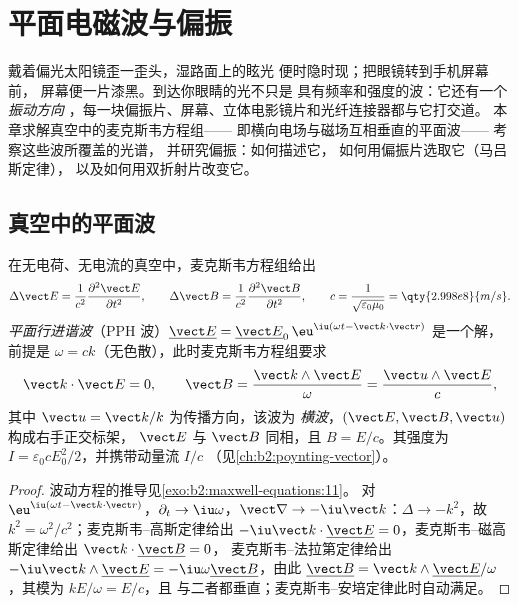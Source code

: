 \chapter{平面电磁波与偏振}\label{ch:b2:plane-waves-polarization}

戴着偏光太阳镜歪一歪头，湿路面上的眩光
便时隐时现；把眼镜转到手机屏幕前，
屏幕便一片漆黑。到达你眼睛的光不只是
具有频率和强度的波：它还有一个\emph{振动方向
}，每一块偏振片、屏幕、立体电影镜片和光纤连接器都与它打交道。
本章求解真空中的麦克斯韦方程组——
即横向电场与磁场互相垂直的平面波——
考察这些波所覆盖的光谱，
并研究偏振：如何描述它，
如何用偏振片选取它（马吕斯定律），
以及如何用双折射片改变它。

\section{真空中的平面波}

\begin{theorem}\label{thm:b2:plane-waves-polarization:wave}
在无电荷、无电流的真空中，麦克斯韦方程组给出
\[
\Delta\vect E = \frac1{c^2}\frac{\partial^2\vect E}{\partial t^2} , \qquad
\Delta\vect B = \frac1{c^2}\frac{\partial^2\vect B}{\partial t^2} , \qquad
c = \frac1{\sqrt{\varepsilon_0\mu_0}} = \qty{2.998e8}{m/s} .
\]
\emph{平面行进谐波}（PPH 波）$\underline{\vect E} =
\underline{\vect E}_0\,\eu^{\iu(\omega t - \vect k\cdot\vect r)}$ 是一个解，前提是
$\omega = ck$（无色散），此时麦克斯韦方程组要求
\[
\vect k\cdot\vect E = 0 , \qquad
\vect B = \frac{\vect k\wedge\vect E}\omega = \frac{\vect u\wedge\vect E}c ,
\]
其中 $\vect u = \vect k/k$ 为传播方向，该波为
\emph{横波}，$(\vect E, \vect B, \vect u)$ 构成右手正交标架，
$\vect E$ 与 $\vect B$ 同相，且 $B = E/c$。其强度为
$I = \varepsilon_0cE_0^2/2$，并携带动量流 $I/c$
（见\cref{ch:b2:poynting-vector}）。
\end{theorem}

\begin{proof}
波动方程的推导见\cref{exo:b2:maxwell-equations:11}。
对 $\eu^{\iu(\omega t - \vect k\cdot\vect r)}$，$\partial_t \to \iu\omega$，$\vect\nabla \to
-\iu\vect k$：$\Delta \to -k^2$，故 $k^2 = \omega^2/c^2$；麦克斯韦--高斯定律给出 $-\iu
\vect k\cdot\underline{\vect E} = 0$，麦克斯韦--磁高斯定律给出 $\vect k\cdot\underline{\vect B} = 0$，
麦克斯韦–法拉第定律给出 $-\iu\vect k\wedge\underline{\vect E} = -\iu\omega\underline{\vect B}$，由此
$\underline{\vect B} = \vect k\wedge\underline{\vect E}/\omega$，其模为 $kE/\omega = E/c$，且
与二者都垂直；麦克斯韦–安培定律此时自动满足。
\end{proof}

